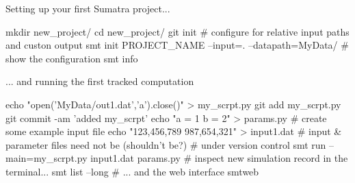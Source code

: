 \begin{frame}[fragile]{Setting up your first Sumatra project...}

  \vspace{0.2cm}
  \begin{mlineshell}
    mkdir new_project/
    cd new_project/
    git init
    # configure for relative input paths and custon output
    smt init PROJECT_NAME --input=. --datapath=MyData/
    # show the configuration
    smt info
  \end{mlineshell}
\end{frame}

\begin{frame}[fragile]{... and running the first tracked computation}

  \begin{mlineshell}
    echo "open('MyData/out1.dat','a').close()" > my_scrpt.py
    git add my_scrpt.py
    git commit -am 'added my_scrpt'
    echo "a = 1
          b = 2" > params.py 
    # create some example input file
    echo "123,456,789
          987,654,321" > input1.dat
    # input & parameter files need not be (shouldn't be?) 
    # under version control
    smt run --main=my_scrpt.py input1.dat params.py
    # inspect new simulation record in the terminal...
    smt list --long
    # ... and the web interface
    smtweb
  \end{mlineshell}

\end{frame}
